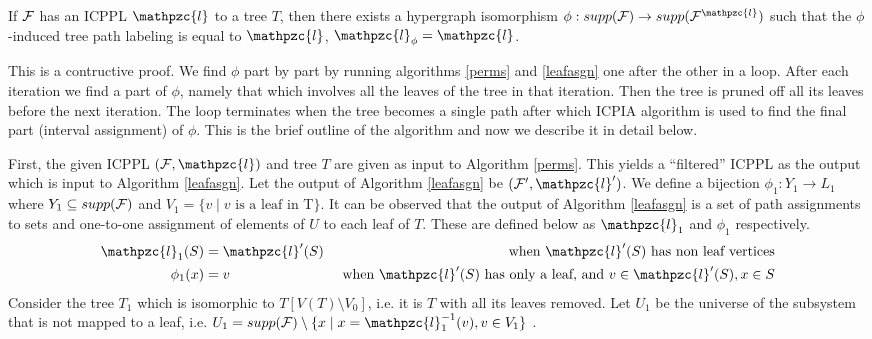 \documentclass{fsttcs}
\def\cF{{\cal F}}
\def\cl{\mathpzc{l}}
\begin{document}
\begin{theorem}
\label{th:perm}
  If $\cF$ has an ICPPL $\cl$ to a tree $T$, then there exists a hypergraph
  isomorphism $\phi : supp(\cF) \rightarrow supp(\cF^\cl)$ such that
  the $\phi$-induced tree path labeling is equal to $\cl$, $\cl_\phi = \cl$.
\end{theorem}
\proof
This is a contructive proof. We find $\phi$ part by part by running
algorithms \ref{perms} and \ref{leafasgn} one after the other
in a loop. After each iteration we find a part of $\phi$, namely
that which involves all the leaves of the tree in that iteration. Then the
tree is pruned off all its leaves before the next iteration. The loop
terminates when the tree becomes a single path after which ICPIA algorithm is
used to find the final part (interval assignment) of $\phi$. This is the brief outline of the
algorithm and now we describe it in detail below.
  



\noindent
First, the given ICPPL $(\cF, \cl)$ and tree $T$
are given as input to Algorithm 
\ref{perms}. This yields a ``filtered'' ICPPL as the output which is
input to Algorithm \ref{leafasgn}.
Let the output of Algorithm \ref{leafasgn} be $(\cF',\cl')$. We define a
bijection $\phi_1: Y_1 \rightarrow L_1$ 
where $Y_1 \subseteq supp(\cF)$ and $V_1 = \{v \mid v \text{ is a leaf
in } $T$\}$.
It can be observed that the output of Algorithm \ref{leafasgn} is a set of path
assignments to sets and one-to-one assignment of elements of $U$ to
each leaf of $T$. These are defined below as $\cl_1$ and $\phi_1$
respectively. 
\vspace{-3mm}
\begin{align*}
  \cl_1(S) &= \cl'(S) &\text{ when $\cl'(S)$ has non leaf vertices} \\
  \phi_1(x) &= v  &\text{ when $\cl'(S)$ has only a leaf, and } v \in \cl'(S), x \in S
\end{align*}
Consider the tree $T_1$ which is isomorphic to $T[V(T) \setminus
V_0]$, i.e. it is $T$ with all its leaves removed. Let $U_1$ be the
universe of the subsystem that is not mapped to a leaf, i.e. $U_1 =
supp(\cF) \setminus \{ x \mid x = \cl_1^{-1}(v), v \in V_1\}$ .
\end{document}
